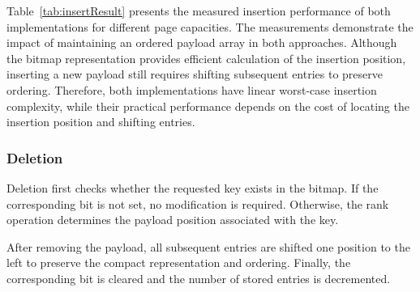 \documentclass[11pt,twoside]{article}
\begin{document}
    Table~\ref{tab:insertResult} presents the measured insertion performance of both implementations for
    different page capacities. The measurements demonstrate the impact of maintaining an ordered
    payload array in both approaches. Although the bitmap representation provides efficient calculation
    of the insertion position, inserting a new payload still requires shifting subsequent entries to
    preserve ordering. Therefore, both implementations have linear worst-case insertion complexity, while their
    practical performance depends on the cost of locating the insertion position and shifting entries.

    \begin{table}[ht]
        \caption{Benchmarking insert operation.}
        \label{tab:insertResult}

    \end{table}


    \subsubsection{Deletion}

    Deletion first checks whether the requested key exists in the bitmap.
    If the corresponding bit is not set, no modification is required.
    Otherwise, the rank operation determines the payload position
    associated with the key.

    After removing the payload, all subsequent entries are shifted one
    position to the left to preserve the compact representation and
    ordering. Finally, the corresponding bit is cleared and the number
    of stored entries is decremented.
\end{document}

